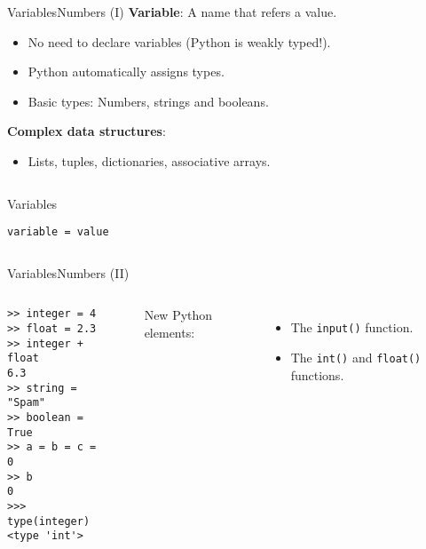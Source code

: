 \documentclass[10pt,compress]{beamer} %
\begin{document}
\begin{frame}[fragile]{Variables}{Numbers (I)}
 	\textbf{Variable}: A name that refers a value.
	\begin{itemize}
		\item No need to declare variables (Python is weakly typed!).
		\item Python automatically assigns types.
		\item Basic types: Numbers, strings and booleans.
	\end{itemize}
	\textbf{Complex data structures}:
		\begin{itemize}
		\item Lists, tuples, dictionaries, associative arrays.
		\end{itemize}

    \begin{columns}
	\begin{block}{Variables}
	\begin{verbatim}
variable = value
\end{verbatim}
	\end{block}
	\end{columns}
\end{frame}

\begin{frame}[fragile]{Variables}{Numbers (II)}
   	\begin{columns}
		\begin{block}{}
		\begin{verbatim}
>> integer = 4
>> float = 2.3
>> integer + float
6.3
>> string = "Spam"
>> boolean = True
>> a = b = c = 0
>> b
0
>>> type(integer)
<type 'int'>
\end{verbatim}
		\end{block}


		\begin{block}{}
		
		\end{block}


	    \bigskip
        New Python elements:
        \begin{itemize}
            \item The \texttt{input()} function.
		    \item The \texttt{int()} and \texttt{float()} functions.
        \end{itemize}
   \end{columns}
\end{frame}
\end{document}
